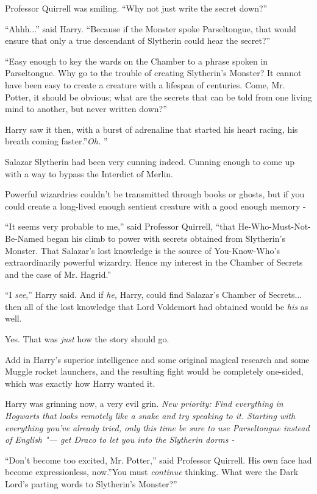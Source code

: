 Professor Quirrell was smiling. ``Why not just write the secret down?''

``Ahhh...'' said Harry. ``Because if the Monster spoke
Parseltongue, that would ensure that only a true descendant of Slytherin
could hear the secret?''

``Easy enough to key the wards on the Chamber to a phrase spoken in
Parseltongue. Why go to the trouble of creating Slytherin's Monster? It
cannot have been easy to create a creature with a lifespan of centuries.
Come, Mr. Potter, it should be obvious; what are the secrets that can be
told from one living mind to another, but never written down?''

Harry saw it then, with a burst of adrenaline that started his heart
racing, his breath coming faster.''\emph{Oh.} ''

Salazar Slytherin had been very cunning indeed. Cunning enough to come
up with a way to bypass the Interdict of Merlin.

Powerful wizardries couldn't be transmitted through books or ghosts, but
if you could create a long-lived enough sentient creature with a good
enough memory -

``It seems very probable to me,'' said Professor Quirrell, ``that
He-Who-Must-Not-Be-Named began his climb to power with secrets obtained
from Slytherin's Monster. That Salazar's lost knowledge is the source of
You-Know-Who's extraordinarily powerful wizardry. Hence my interest in
the Chamber of Secrets and the case of Mr. Hagrid.''

``I \emph{see},'' Harry said. And if \emph{he,} Harry, could find
Salazar's Chamber of Secrets... then all of the lost knowledge that
Lord Voldemort had obtained would be \emph{his} as well.

Yes. That was \emph{just} how the story should go.

Add in Harry's superior intelligence and some original magical research
and some Muggle rocket launchers, and the resulting fight would be
completely one-sided, which was exactly how Harry wanted it.

Harry was grinning now, a very evil grin. \emph{New priority: Find
everything in Hogwarts that looks remotely like a snake and try speaking
to it. Starting with everything you've already tried, only this time be
sure to use Parseltongue instead of English "--- get Draco to let you into
the Slytherin dorms -}

``Don't become too excited, Mr. Potter,'' said Professor Quirrell. His
own face had become expressionless, now.''You must \emph{continue}
thinking. What were the Dark Lord's parting words to Slytherin's
Monster?''


